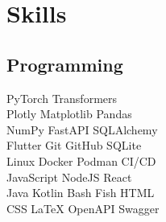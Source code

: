 \documentclass[]{resume-template}
\begin{document}
\begin{minipage}[t]{0.33\textwidth}




    \section{Skills}\label{sec:skills}
    \subsection{Programming}\label{subsec:programming}
    PyTorch \textbullet Transformers \textbullet{} \\
    Plotly \textbullet{} Matplotlib \textbullet{} Pandas \textbullet{}\\
    NumPy \textbullet{} FastAPI \textbullet SQLAlchemy \\
    Flutter \textbullet{} Git \textbullet{} GitHub \textbullet{} SQLite \textbullet{}\\
    Linux \textbullet Docker \textbullet Podman \textbullet {} CI/CD \\
    JavaScript \textbullet{} NodeJS \textbullet{} React \\
    Java \textbullet{} Kotlin \textbullet{} Bash \textbullet{} Fish \textbullet{} HTML \textbullet{}\\
    CSS \textbullet{} \LaTeX \textbullet{} OpenAPI \textbullet Swagger
    \vspace{\topsep}

\end{minipage}
\end{document}

